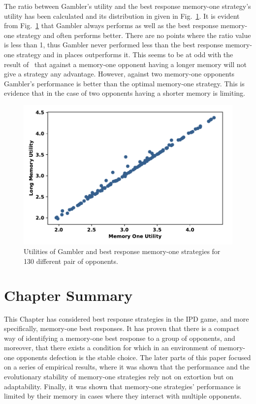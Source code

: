 The ratio between Gambler's utility and the best response memory-one strategy's utility has been calculated and its distribution in
given in Fig.~\ref{fig:utilities_gambler_mem_one}.
It is evident from Fig.~\ref{fig:utilities_gambler_mem_one} that
Gambler always performs as well as the best response memory-one strategy and often performs better. There are
no points where the ratio value is less than 1, thus Gambler never performed less
than the best response memory-one strategy and in places outperforms it. This seems to be at odd with the
result of~\cite{Press2012} that against a memory-one opponent having a longer memory
will not give a strategy any
advantage. However, against two memory-one opponents Gambler's performance is better than
the optimal memory-one strategy. This is evidence that in the case of two opponents having a
shorter memory is limiting.

\begin{figure}[!htbp]
    \centering
    \includegraphics[width=.55\textwidth]{src/chapters/05/paper/Memory-size-in-the-prisoners-dilemma/img/gambler_performance_against_mem_one.pdf}
    \caption{Utilities of Gambler and best response memory-one strategies for
    130 different pair of opponents.}\label{fig:utilities_gambler_mem_one}
\end{figure}

\section{Chapter Summary}

This Chapter has considered best response strategies in the IPD game, and
more specifically, memory-one best responses. It has proven that there is
a compact way of identifying a memory-one best response to a group of opponents,
and moreover, that there exists a condition for which in an
environment of memory-one opponents defection is the stable choice.
The later parts of this paper focused on a series of empirical results, where it
was shown that the performance and the evolutionary stability of memory-one
strategies rely not on extortion but on adaptability. Finally, it was shown that
memory-one strategies' performance is limited by their memory in cases where
they interact with multiple opponents.


